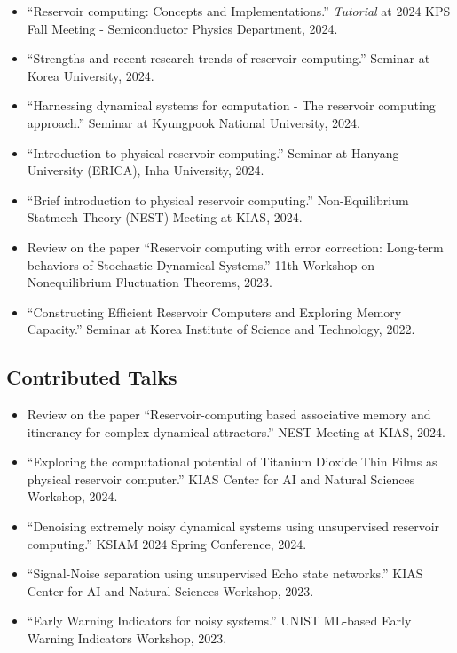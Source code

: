 \documentclass[11pt,a4paper]{article}
\begin{document}
\begin{itemize}[leftmargin=1.5em, topsep=0.2em, itemsep=0.2em]
    \item ``Reservoir computing: Concepts and Implementations.'' \textit{Tutorial} at 2024 KPS Fall Meeting - Semiconductor Physics Department, 2024.
    
    \item ``Strengths and recent research trends of reservoir computing.'' Seminar at Korea University, 2024.
    
    \item ``Harnessing dynamical systems for computation - The reservoir computing approach.'' Seminar at Kyungpook National University, 2024.
    
    \item ``Introduction to physical reservoir computing.'' Seminar at Hanyang University (ERICA), Inha University, 2024.
    
    \item ``Brief introduction to physical reservoir computing.'' Non-Equilibrium Statmech Theory (NEST) Meeting at KIAS, 2024.
    
    \item Review on the paper ``Reservoir computing with error correction: Long-term behaviors of Stochastic Dynamical Systems.'' 11th Workshop on Nonequilibrium Fluctuation Theorems, 2023.
    
    \item ``Constructing Efficient Reservoir Computers and Exploring Memory Capacity.'' Seminar at Korea Institute of Science and Technology, 2022.
\end{itemize}

\subsection*{Contributed Talks}

\begin{itemize}[leftmargin=1.5em, topsep=0.2em, itemsep=0.2em]
    \item Review on the paper ``Reservoir-computing based associative memory and itinerancy for complex dynamical attractors.'' NEST Meeting at KIAS, 2024.
    
    \item ``Exploring the computational potential of Titanium Dioxide Thin Films as physical reservoir computer.'' KIAS Center for AI and Natural Sciences Workshop, 2024.
    
    \item ``Denoising extremely noisy dynamical systems using unsupervised reservoir computing.'' KSIAM 2024 Spring Conference, 2024.
    
    \item ``Signal-Noise separation using unsupervised Echo state networks.'' KIAS Center for AI and Natural Sciences Workshop, 2023.
    
    \item ``Early Warning Indicators for noisy systems.'' UNIST ML-based Early Warning Indicators Workshop, 2023.
\end{itemize}
\end{document}

